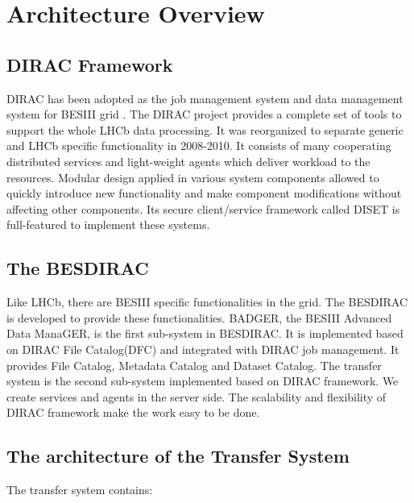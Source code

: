 \section{Architecture Overview}

\subsection{DIRAC Framework}

DIRAC \cite{bib:dirac3} 
has been adopted as the job management system and data management
system for BESIII grid \cite{bib:besdfc}. 
The DIRAC project provides a 
complete set of tools to support the whole LHCb data processing.
It was reorganized to separate generic and LHCb specific functionality
in 2008-2010.
%
It consists of many cooperating distributed services and light-weight
agents which deliver workload to the resources.
Modular design applied in various system components allowed to quickly
introduce new functionality and make component modifications without
affecting other components.
Its secure client/service framework called DISET \cite{bib:diset} 
is full-featured to implement these systems.

\subsection{The BESDIRAC}

Like LHCb, there are BESIII specific functionalities in the grid.
The BESDIRAC \cite{bib:besdirac} 
is developed to provide these functionalities.
BADGER, the BESIII Advanced Data ManaGER, is the first sub-system
in BESDIRAC. It is implemented based on DIRAC File Catalog(DFC)
and integrated with DIRAC job management.
It provides File Catalog, Metadata Catalog and Dataset Catalog.
%
The transfer system is the second sub-system implemented based on
DIRAC framework. We create services and agents in the server side.
The scalability and flexibility of DIRAC framework make the work
easy to be done. 

\subsection{The architecture of the Transfer System}

The transfer system contains:

